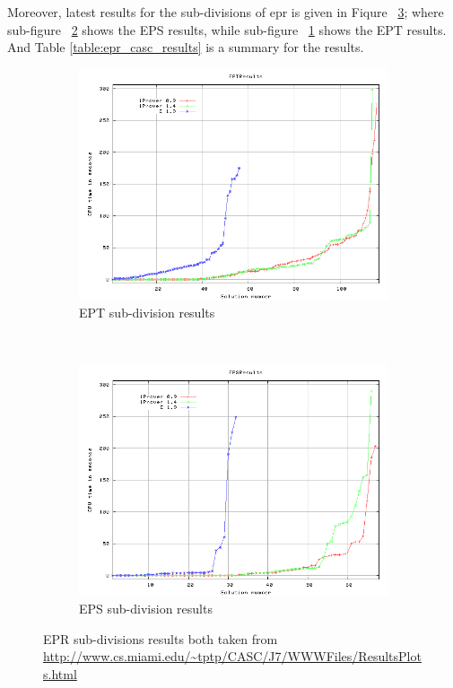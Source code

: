 Moreover, latest results for the sub-divisions of \ac{epr} is given in Fiqure ~\ref{fig:epr_divisions_casc_results}; where sub-figure ~\ref{fig:eps_casc_results} shows the EPS results, while sub-figure ~\ref{fig:ept_casc_results} shows the EPT results. And Table \ref{table:epr_casc_results} is a summary for the results.

\begin{figure}[H]
    \centering
    \begin{subfigure}[H]{\textwidth}
        \centering
        \includegraphics[scale=0.5]{pictures/EPTResults-Proof-Time.png}
        \caption{EPT sub-division results \label{fig:ept_casc_results}}
    \end{subfigure}
    ~ 
    \begin{subfigure}[H]{\textwidth}
        \centering
        \includegraphics[scale=0.5]{pictures/EPSResults-Proof-Time.png}
        \caption{EPS sub-division results \label{fig:eps_casc_results}}
    \end{subfigure}
    \caption{EPR sub-divisions results both taken from \url{http://www.cs.miami.edu/~tptp/CASC/J7/WWWFiles/ResultsPlots.html} \label{fig:epr_divisions_casc_results}}
\end{figure}


